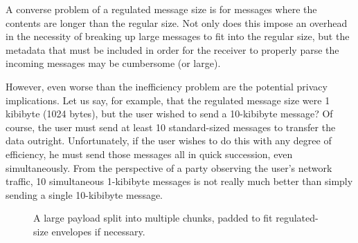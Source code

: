 A converse problem of a regulated message size is for messages where the contents are longer than the regular size. Not only does this impose an overhead in the necessity of breaking up large messages to fit into the regular size, but the metadata that must be included in order for the receiver to properly parse the incoming messages may be cumbersome (or large).

However, even worse than the inefficiency problem are the potential privacy implications. Let us say, for example, that the regulated message size were 1 kibibyte (1024 bytes), but the user wished to send a 10-kibibyte message? Of course, the user must send at least 10 standard-sized messages to transfer the data outright. Unfortunately, if the user wishes to do this with any degree of efficiency, he must send those messages all in quick succession, even simultaneously. From the perspective of a party observing the user's network traffic, 10 simultaneous 1-kibibyte messages is not really much better than simply sending a single 10-kibibyte message.

\begin{figure}[h]
    \centering
    \caption{A large payload split into multiple chunks, padded to fit regulated-size envelopes if necessary.}
    \label{fig:payload_chunks}
\end{figure}

